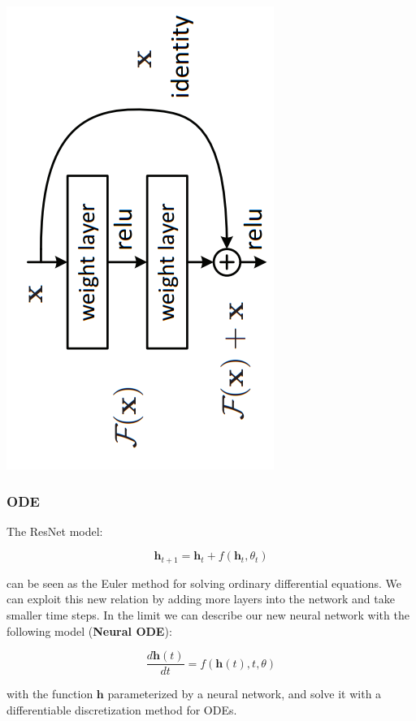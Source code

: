 \documentclass{beamer}
\begin{document}
{\begin{frame}
	\begin{center}
	\includegraphics[scale = 0.4]{resnet.png}
         \end{center}

\end{frame}
\begin{frame}
	\frametitle{ODE}
	The ResNet model:

	\begin{equation}
	\textbf{h}_{t+1} =\textbf{h}_t + f(\textbf{h}_t, \theta_t)
	\end{equation}

	can be seen as  the Euler method for solving ordinary differential equations. We can exploit this new relation by adding more layers into the network and take smaller time steps.  In the limit we can describe our new neural network with the following model (\textbf{Neural ODE}):

	\begin{equation}
	\frac{d \textbf{h}(t)}{dt} = f(\textbf{h}(t), t, \theta)
	\end{equation}

	 with the function $\textbf{h}$ parameterized by a neural network, and solve it with a differentiable discretization method for ODEs.
\end{frame}

}
\end{document}
